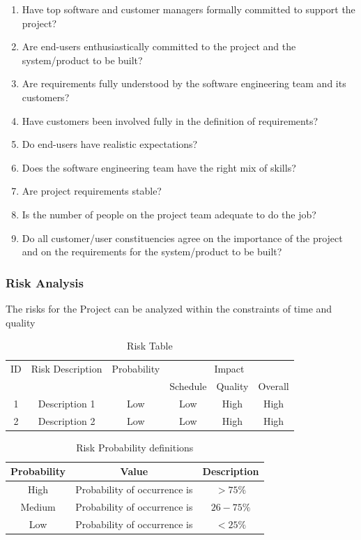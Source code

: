 \documentclass[12pt,a4paper]{article}
\begin{document}
\begin{enumerate}
\item Have top software and customer managers formally committed to support the project?
\item Are end-users enthusiastically committed to the project and the system/product to be built?
\item Are requirements fully understood by the software engineering team and its customers?
\item Have customers been involved fully in the definition of requirements?
\item Do end-users have realistic expectations?
\item Does the software engineering team have the right mix of skills?
\item Are project requirements stable?
\item Is the number of people on the project team adequate to do the job?
\item Do all customer/user constituencies agree on the importance of the project and on the requirements for the system/product to be built?
\end{enumerate}

\subsubsection{Risk Analysis}
The risks for the Project can be analyzed within the constraints of time and quality

\begin{table}[!htbp]
\begin{center}
\def\arraystretch{1.5}
\begin{tabular}{| c | c | c | c | c | c |}
\hline
{ID} & {Risk Description}	& {Probability} & \multicolumn{3}{|c|}{Impact} \\ \cline{4-6}
	& & &	Schedule	& Quality	& Overall \\ \hline
1	& Description 1	& Low	& Low	& High	& High \\ \hline
2	& Description 2	& Low	& Low	& High	& High \\ \hline
\end{tabular}
\end{center}
\caption{Risk Table}
\label{tab:risk}
\end{table}


\begin{table}[!htbp]
\begin{center}
\def\arraystretch{1.5}
\begin{tabular}{| c | c | c |}
\hline
Probability & Value &	Description \\ \hline
High &	Probability of occurrence is &  $ > 75 \% $ \\ \hline
Medium &	Probability of occurrence is  & $26-75 \% $ \\ \hline
Low	& Probability of occurrence is & $ < 25 \% $ \\ \hline
\end{tabular}
\end{center}
\caption{Risk Probability definitions \cite{bookPressman}}
\label{tab:riskdef}
\end{table}
\end{document}
